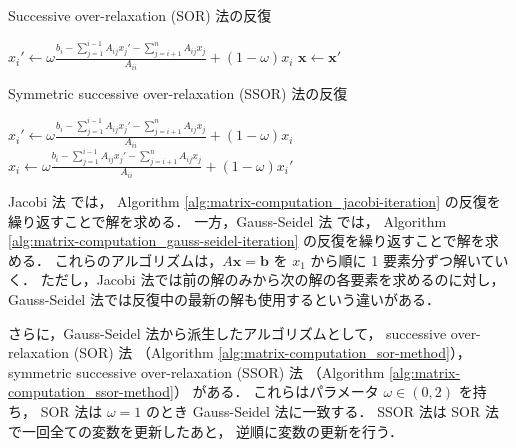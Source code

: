 \begin{algorithm}[p]
    \caption{Successive over-relaxation (SOR) 法の反復 \cite{Golub2013}}
    \label{alg:matrix-computation_sor-method}
    \begin{algorithmic}[1]
        \State $x_i' \gets \omega \frac{\displaystyle b_i - \sum_{j = 1}^{i - 1} A_{ij} x_j' %
                - \sum_{j = i + 1}^{n} A_{ij} x_j}{\displaystyle A_{ii}} %
            + (1 - \omega) x_i$
        \EndFor
        \State $\bm{x} \gets \bm{x}'$
        \EndProcedure
    \end{algorithmic}
\end{algorithm}

\begin{algorithm}[p]
    \caption{Symmetric successive over-relaxation (SSOR) 法の反復 \cite{Golub2013}}
    \label{alg:matrix-computation_ssor-method}
    \begin{algorithmic}[1]
        \State $x_i' \gets \omega \frac{\displaystyle b_i - \sum_{j = 1}^{i - 1} A_{ij} x_j' %
                - \sum_{j = i + 1}^{n} A_{ij} x_j}{\displaystyle A_{ii}} %
            + (1 - \omega) x_i$
        \EndFor
        \State $x_i \gets \omega \frac{\displaystyle b_i - \sum_{j = 1}^{i - 1} A_{ij} x_j' %
                - \sum_{j = i + 1}^{n} A_{ij} x_j}{\displaystyle A_{ii}} %
            + (1 - \omega) x_i'$
        \EndFor
        \EndProcedure
    \end{algorithmic}
\end{algorithm}

Jacobi 法
では，
Algorithm \ref{alg:matrix-computation_jacobi-iteration}
の反復を繰り返すことで解を求める．
一方，Gauss-Seidel 法
では，
Algorithm \ref{alg:matrix-computation_gauss-seidel-iteration}
の反復を繰り返すことで解を求める．
これらのアルゴリズムは，$A \bm{x} = \bm{b}$ を
$x_1$ から順に 1 要素分ずつ解いていく．
ただし，Jacobi 法では前の解のみから次の解の各要素を求めるのに対し，
Gauss-Seidel 法では反復中の最新の解も使用するという違いがある．

さらに，Gauss-Seidel 法から派生したアルゴリズムとして，
successive over-relaxation (SOR) 法
（Algorithm \ref{alg:matrix-computation_sor-method}），
symmetric successive over-relaxation (SSOR) 法
（Algorithm \ref{alg:matrix-computation_ssor-method}）
がある．
これらはパラメータ $\omega \in (0, 2)$ を持ち，
SOR 法は $\omega = 1$ のとき Gauss-Seidel 法に一致する．
SSOR 法は SOR 法で一回全ての変数を更新したあと，
逆順に変数の更新を行う．

